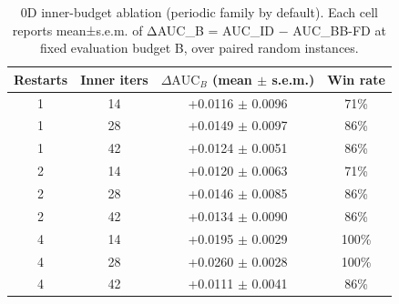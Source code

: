 \begin{table}[t]
\centering
\caption{0D inner-budget ablation (periodic family by default). Each cell reports mean±s.e.m. of ΔAUC_B = AUC_ID − AUC_BB-FD at fixed evaluation budget B, over paired random instances.}
\label{tab:0D_inner_budget}
\small
\begin{tabular}{ccc c}
\toprule
Restarts & Inner iters & $\Delta\mathrm{AUC}_B$ (mean $\pm$ s.e.m.) & Win rate \\
\midrule
1 & 14 & +0.0116 $\pm$ 0.0096 & 71\% \\
1 & 28 & +0.0149 $\pm$ 0.0097 & 86\% \\
1 & 42 & +0.0124 $\pm$ 0.0051 & 86\% \\
2 & 14 & +0.0120 $\pm$ 0.0063 & 71\% \\
2 & 28 & +0.0146 $\pm$ 0.0085 & 86\% \\
2 & 42 & +0.0134 $\pm$ 0.0090 & 86\% \\
4 & 14 & +0.0195 $\pm$ 0.0029 & 100\% \\
4 & 28 & +0.0260 $\pm$ 0.0028 & 100\% \\
4 & 42 & +0.0111 $\pm$ 0.0041 & 86\% \\
\bottomrule
\end{tabular}
\end{table}
